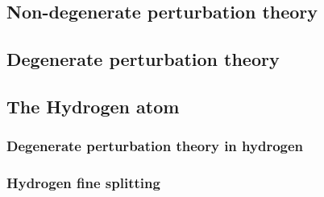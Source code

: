 \subsection{Non-degenerate perturbation theory}
\subsection{Degenerate perturbation theory}
\subsection{The Hydrogen atom}
\subsubsection{Degenerate perturbation theory in hydrogen}
\subsubsection{Hydrogen fine splitting}